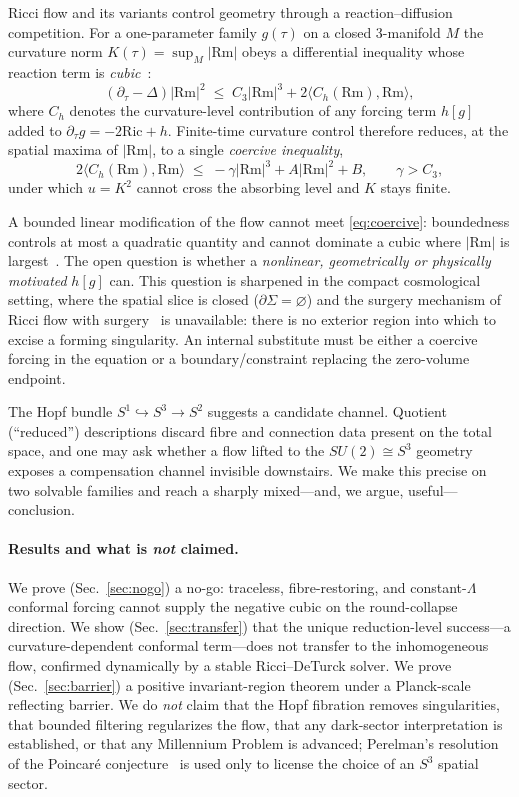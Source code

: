 \documentclass[aps,prd,twocolumn,superscriptaddress,nofootinbib,floatfix]{revtex4-2}
\theoremstyle{plain}
\theoremstyle{definition}
\newcommand{\Rm}{\mathrm{Rm}}
\newcommand{\Rmn}{|\Rm|}
\newcommand{\Ric}{\mathrm{Ric}}
\newcommand{\dtau}{\partial_\tau}
\begin{document}
Ricci flow and its variants control geometry through a reaction--diffusion competition. For a one-parameter family $g(\tau)$ on a closed $3$-manifold $M$ the curvature norm $K(\tau)=\sup_M\Rmn$ obeys a differential inequality whose reaction term is \emph{cubic}~\cite{Hamilton1982,ChowKnopf}:
\begin{equation}\label{eq:reaction}
(\dtau-\Delta)|\Rm|^2 \;\le\; C_3|\Rm|^3 + 2\langle C_h(\Rm),\Rm\rangle ,
\end{equation}
where $C_h$ denotes the curvature-level contribution of any forcing term $h[g]$ added to $\dtau g=-2\Ric+h$. Finite-time curvature control therefore reduces, at the spatial maxima of $\Rmn$, to a single \emph{coercive inequality},
\begin{equation}\label{eq:coercive}
2\langle C_h(\Rm),\Rm\rangle \;\le\; -\gamma|\Rm|^3 + A|\Rm|^2 + B,\qquad \gamma>C_3 ,
\end{equation}
under which $u=K^2$ cannot cross the absorbing level and $K$ stays finite.

A bounded linear modification of the flow cannot meet \eqref{eq:coercive}: boundedness controls at most a quadratic quantity and cannot dominate a cubic where $\Rmn$ is largest~\cite{ChowKnopf}. The open question is whether a \emph{nonlinear, geometrically or physically motivated} $h[g]$ can. This question is sharpened in the compact cosmological setting, where the spatial slice is closed ($\partial\Sigma=\varnothing$) and the surgery mechanism of Ricci flow with surgery~\cite{Perelman1,Perelman2} is unavailable: there is no exterior region into which to excise a forming singularity. An internal substitute must be either a coercive forcing in the equation or a boundary/constraint replacing the zero-volume endpoint.

The Hopf bundle $S^1\hookrightarrow S^3\to S^2$ suggests a candidate channel. Quotient (``reduced'') descriptions discard fibre and connection data present on the total space, and one may ask whether a flow lifted to the $SU(2)\cong S^3$ geometry exposes a compensation channel invisible downstairs. We make this precise on two solvable families and reach a sharply mixed---and, we argue, useful---conclusion.

\paragraph{Results and what is \emph{not} claimed.}
We prove (Sec.~\ref{sec:nogo}) a no-go: traceless, fibre-restoring, and constant-$\Lambda$ conformal forcing cannot supply the negative cubic on the round-collapse direction. We show (Sec.~\ref{sec:transfer}) that the unique reduction-level success---a curvature-dependent conformal term---does not transfer to the inhomogeneous flow, confirmed dynamically by a stable Ricci--DeTurck solver. We prove (Sec.~\ref{sec:barrier}) a positive invariant-region theorem under a Planck-scale reflecting barrier. We do \emph{not} claim that the Hopf fibration removes singularities, that bounded filtering regularizes the flow, that any dark-sector interpretation is established, or that any Millennium Problem is advanced; Perelman's resolution of the Poincar\'e conjecture~\cite{Perelman1,Perelman2,MorganTian} is used only to license the choice of an $S^3$ spatial sector.
\end{document}
